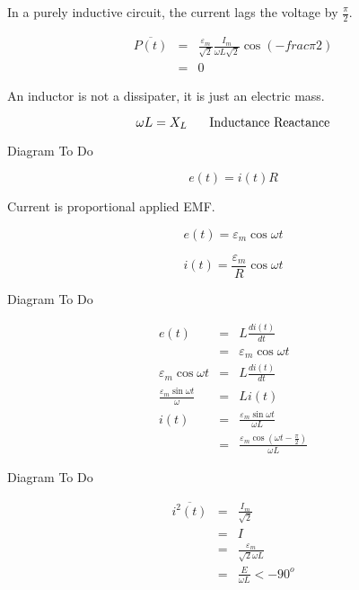\documentclass[a4paper,12pt]{article}
\begin{document}
In a purely inductive circuit, the current lags the voltage by
$\frac{\pi}{2}$.

\begin{eqnarray*}
\overline{P(t)} & = & \frac{\varepsilon_{m}}{\sqrt{2}} \frac{I_{m}}{\omega
L \sqrt{2}} \cos{\left(-frac{\pi}{2}\right)} \\
	& = & 0
\end{eqnarray*}

An inductor is not a dissipater, it is just an electric mass.

\[ \omega L = X_{L} \mbox{\hspace{5mm} Inductance Reactance} \]


\begin{table}[hbtp]

Diagram To Do

\end{table}

\[ e(t) = i(t) R \]

Current is proportional applied EMF.

\[ e(t) = \varepsilon_{m} \cos{\omega t} \]

\[ i(t) = \frac{\varepsilon_{m}}{R} \cos{\omega t} \]

\begin{table}[hbtp]

Diagram To Do

\end{table}

\begin{eqnarray*}
e(t) & = & L \frac{di(t)}{dt} \\
	  & = & \varepsilon_{m} \cos{\omega t} \\
\varepsilon_{m} \cos{\omega t} & = & L \frac{di(t)}{dt} \\
\frac{\varepsilon_{m} \sin{\omega t}}{\omega} & = & L i(t) \\
i(t) & = & \frac{\varepsilon_{m} \sin{\omega t}}{\omega L} \\
	  & = & \frac{\varepsilon_{m} \cos{(\omega t - \frac{\pi}{2})}}{\omega L}
\end{eqnarray*}

\begin{table}[hbtp]

Diagram To Do

\end{table}

\begin{eqnarray*}
\overline{i^{2}(t)} & = & \frac{I_{m}}{\sqrt{2}} \\
						  & = & I \\
						  & = & \frac{\varepsilon_{m}}{\sqrt{2} \omega L} \\
						  & = & \frac{E}{\omega L} < - 90^{o}
\end{eqnarray*}						  
\end{document}
